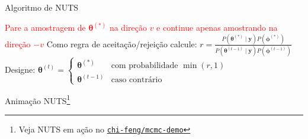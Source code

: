 \begin{frame}{Algoritmo de NUTS}
\begin{algorithm}[H]
{{     }{
       \textcolor{red}{Pare a amostragem de $\boldsymbol{\theta}^{(*)}$ na direção $v$ e continue apenas amostrando na direção $-v$}\;
       }{
     }
    }
    Como regra de aceitação/rejeição calcule:
    $r = \frac{P \left(\boldsymbol{\theta}^{(*)} \mid \boldsymbol{y} \right) P \left(\boldsymbol{\phi}^{(*)} \right)}{P \left(\boldsymbol{\theta}^{(t-1)} \mid \boldsymbol{y} \right) P \left(\boldsymbol{\phi}^{(t-1)} \right)}$\;
    Designe:
      $
        \boldsymbol{\theta}^{(t)} =
          \begin{cases}
          \boldsymbol{\theta}^{(*)} & \text{com probabilidade $\min(r,1)$}\\
          \boldsymbol{\theta}^{(t-1)} & \text{caso contrário}
        \end{cases}
      $\;
    \caption{No-U-Turn-Sampler (NUTS)}
    \end{algorithm}
\end{frame}

\begin{frame}{Animação NUTS\footnote{Veja NUTS em ação no \href{https://chi-feng.github.io/mcmc-demo/app.html?algorithm=EfficientNUTS&target=banana}{\texttt{chi-feng/mcmc-demo}}}}
  \centering
\end{frame}

